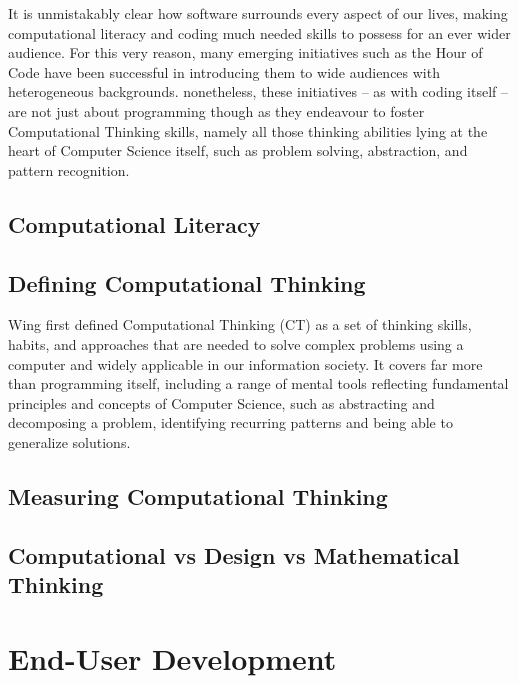 It is unmistakably clear how software surrounds every aspect of our lives, making computational literacy and coding much needed skills to possess for an ever wider audience. For this very reason, many emerging initiatives such as the Hour of Code have been successful in introducing them to wide audiences with heterogeneous backgrounds. nonetheless, these initiatives – as with coding itself – are not just about programming though as they endeavour to foster Computational Thinking skills, namely all those thinking abilities lying at the heart of Computer Science itself, such as problem solving, abstraction, and pattern recognition.

\subsection{Computational Literacy} %

\subsection{Defining Computational Thinking} %
Wing first defined Computational Thinking (CT) as a set of thinking skills, habits, and approaches that are needed to solve complex problems using a computer and widely applicable in our information society. It covers far more than programming itself, including a range of mental tools reflecting fundamental principles and concepts of Computer Science, such as abstracting and decomposing a problem, identifying recurring patterns and being able to generalize solutions.

\subsection{Measuring Computational Thinking} %

\subsection{Computational vs Design vs Mathematical Thinking} %

\section{End-User Development}

